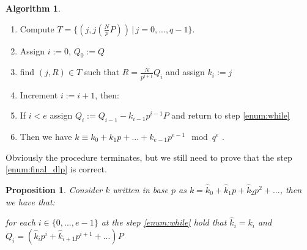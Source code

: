 \documentclass{article}
\theoremstyle{plain}
\newtheorem{prop}[teo]{Proposition}
\theoremstyle{remark}
\theoremstyle{definition}
\newtheorem{algo}[teo]{Algorithm}
\begin{document}
\begin{algo}\label{algo:ecdlp_naive}

	\begin{enumerate}
		\item \label{enum:store} Compute $T = \{ (j,j\left(\frac{N}{p}P\right)) \,|\, j = 0,...,q-1 \}$.
		\item Assign $i := 0$, $Q_0 := Q$
		\item \label{enum:while} find $(j,R)\in T$ such that $R = \frac{N}{p^{i+1}}Q_i$ and assign $k_i := j$
		\item Increment $i := i + 1$, then:
		\item \label{enum:if} If $i < e$ assign $Q_i := Q_{i-1} - k_{i-1} p^{i-1}P$ and return to step \ref{enum:while}
		\item Then we have $k \equiv k_0 + k_1p + ... + k_{e-1}p^{e-1} \mod q^e$ \label{enum:final_dlp}.
	\end{enumerate}

\end{algo}


Obviously the procedure terminates, but we still need to prove that the step \ref{enum:final_dlp} is correct.

\begin{prop}
	\label{prop:corr_dlp}
	Consider $k$ written in base $p$ as $k = \hat{k}_0 + \hat{k}_1p + \hat{k}_2p^2 + ...$, then we have that:

	for each $i \in \{0,...,e-1\}$ at the step \ref{enum:while} hold that 
	$\hat{k}_i = k_i$ and $Q_i = (\hat{k}_ip^i + \hat{k}_{i+1}p^{i+1} + ... )P$
\end{prop}
\end{document}
